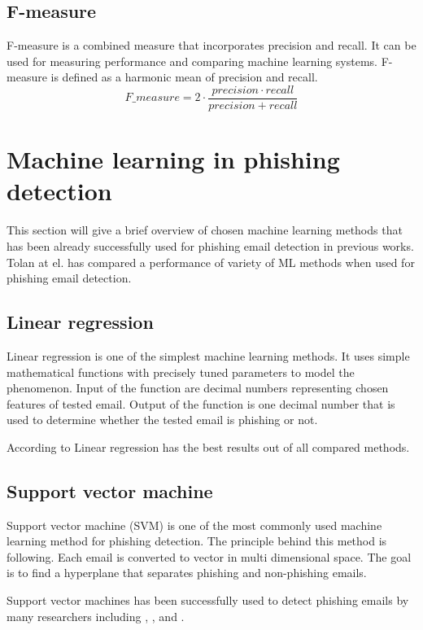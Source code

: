\documentclass[thesis=B,english]{FITthesis}[2012/10/20]
\begin{document}
\subsection{F-measure}
F-measure is a combined measure that incorporates precision and recall. It can be used for measuring performance and comparing machine learning systems. F-measure is defined as a harmonic mean of precision and recall.
\[F\_measure = 2 \cdot \frac{precision \cdot recall}{precision + recall} \]


\section{Machine learning in phishing detection}
This section will give a brief overview of chosen machine learning methods that has been already successfully used for phishing email detection in previous works. Tolan at el. \cite{ultimateFeatureBreakdown} has compared a performance of variety of ML methods when used for phishing email detection. 

\subsection{Linear regression}
Linear regression is one of the simplest machine learning methods. It uses simple mathematical functions with precisely tuned parameters to model the phenomenon. Input of the function are decimal numbers representing chosen features of tested email. Output of the function is one decimal number that is used to determine whether the tested email is phishing or not. 
\par According to \cite{abu2007comparison} Linear regression has the best results out of all compared methods. 
    
\subsection{Support vector machine}
Support vector machine (SVM) is one of the most commonly used machine learning method for phishing detection. The principle behind this method is following. Each email is converted to vector in multi dimensional space. The goal is to find a hyperplane that separates phishing and non-phishing emails. 
\par Support vector machines has been successfully used to detect phishing emails by many researchers including
\cite{features2006Chandrasekaran}, \cite{featuresBasnet2008detection}, \cite{featuresMa2009detecting} and \cite{ultimateFeatureBreakdown}.
    
\end{document}
